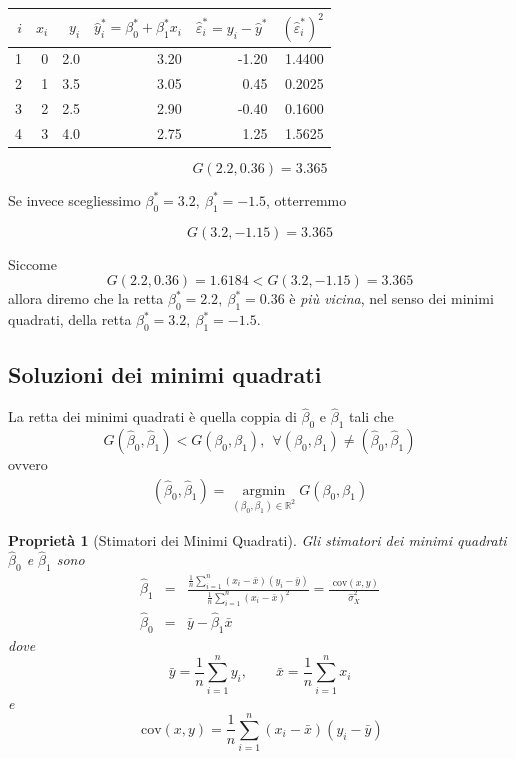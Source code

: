 \documentclass[
  11pt,
]{book}
\theoremstyle{mytheoremstyle}
\newtheorem{proposition}{Proprietà}[section]
\theoremstyle{mydefstyle}
\begin{document}
\begin{tabular}{rrrrrr}
\toprule
$i$ & $x_i$ & $y_i$ & $\hat y_i^*=\beta_0^*+\beta_1^*x_i$ & $\hat\varepsilon_i^*=y_i-\hat y^*$ & $({\hat\varepsilon_i^*})^2$\\
\midrule
1 & 0 & 2.0 & 3.20 & -1.20 & 1.4400\\
2 & 1 & 3.5 & 3.05 & 0.45 & 0.2025\\
3 & 2 & 2.5 & 2.90 & -0.40 & 0.1600\\
4 & 3 & 4.0 & 2.75 & 1.25 & 1.5625\\
\bottomrule
\end{tabular}

\[G(2.2,0.36)=3.365\]

Se invece scegliessimo \(\beta_0^*=3.2,~\beta_1^*=-1.5\), otterremmo

\[G(3.2,-1.15)=3.365\]

Siccome
\[G(2.2,0.36)=1.6184<G(3.2,-1.15)=3.365\]
allora diremo che la retta \(\beta_0^*=2.2,~\beta_1^*=0.36\) è \emph{più vicina}, nel senso dei minimi quadrati, della retta \(\beta_0^*=3.2,~\beta_1^*=-1.5\).

\subsection{Soluzioni dei minimi quadrati}\label{soluzioni-dei-minimi-quadrati}

La retta dei minimi quadrati è quella coppia di \(\hat\beta_0\) e \(\hat\beta_1\) tali che
\[G(\hat\beta_0,\hat\beta_1)<G(\beta_0,\beta_1),~~\forall(\beta_0,\beta_1)\neq(\hat\beta_0,\hat\beta_1)\]
ovvero
\begin{eqnarray*}
(\hat\beta_0,\hat\beta_1)=\operatorname*{argmin}_{(\beta_0,\beta_1)\in\mathbb{R}^2}G(\beta_0,\beta_1)
\end{eqnarray*}

\begin{info}

\begin{proposition}[Stimatori dei Minimi Quadrati]
Gli stimatori dei minimi quadrati \(\hat\beta_0\) e \(\hat\beta_1\) sono
\begin{eqnarray*}
\hat\beta_1 &=& \frac{\frac 1 n\sum_{i=1}^n{(x_i-\bar x)(y_i-\bar y)}}{\frac 1 n\sum_{i=1}^n(x_i-\bar x)^2}=\frac{\text{ cov}(x,y)}{\hat\sigma^2_X}\\
\hat\beta_0 &=&\bar y -\hat\beta_1\bar x
\end{eqnarray*}
dove
\[\bar y = \frac 1 n\sum_{i=1}^n y_i,\qquad \bar x=\frac 1 n \sum_{i=1}^n x_i\]
e
\[
\text{ cov}(x,y) = \frac 1 n\sum_{i=1}^n(x_i-\bar x)(y_i-\bar y)
\]
\end{proposition}

\end{info}
\end{document}

